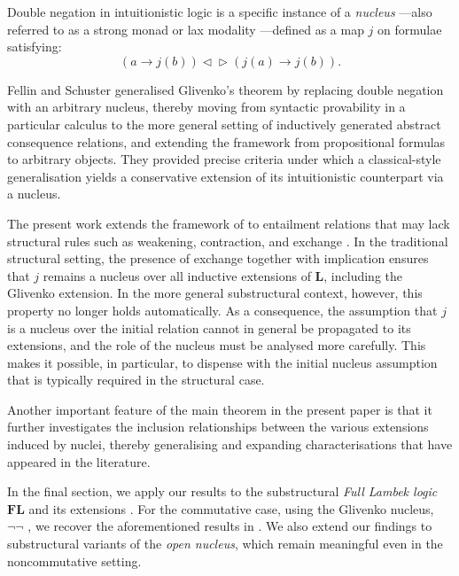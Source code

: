 \documentclass[runningheads]{llncs}
\renewcommand{\L}{\mathbf{L}}
\newcommand{\FL}{\mathbf{FL}}
\begin{document}
Double negation in intuitionistic logic is a specific instance of a \emph{nucleus} \cite{aczel:aspects,hayk:more,joh:sto,negri:cont,rosen,simm:frame,simm:cur,van:kuroda}---also referred to as a strong monad \cite{kock:sdg} or lax modality \cite{aczel_2001}---defined as a map $j$ on formulae satisfying:
\[
(a \to j(b)) \lhd\!\!\rhd (j(a) \to j(b)).
\]

Fellin and Schuster \cite{fel:nuclei,fel:cat} generalised Glivenko's theorem by replacing double negation with an arbitrary nucleus, thereby moving from syntactic provability in a particular calculus to the more general setting of inductively generated abstract consequence relations, and extending the framework from propositional formulas to arbitrary objects. They provided precise criteria under which a classical-style generalisation yields a conservative extension of its intuitionistic counterpart via a nucleus.

The present work extends the framework of \cite{fel:nuclei,fel:cat} to entailment relations that may lack structural rules such as weakening, contraction, and exchange \cite{PAOLI,restall:sub}. In the traditional structural setting, the presence of exchange together with implication ensures that $j$ remains a nucleus over all inductive extensions of $\L$, including the Glivenko extension. In the more general substructural context, however, this property no longer holds automatically. As a consequence, the assumption that $j$ is a nucleus over the initial relation cannot in general be propagated to its extensions, and the role of the nucleus must be analysed more carefully. This makes it possible, in particular, to dispense with the initial nucleus assumption that is typically required in the structural case.

Another important feature of the main theorem in the present paper is that it further investigates the inclusion relationships between the various extensions induced by nuclei, thereby generalising and expanding characterisations that have appeared in the literature.

In the final section, we apply our results to the substructural \emph{Full Lambek logic}~$\FL$ and its extensions \cite{Lambek1958TheMO,Lambek1961OnTC,Lambek1995SomeLM}. For the commutative case, using the Glivenko nucleus, $\neg\neg$ \cite{van:kuroda,esca:peirce}, we recover the aforementioned results in \cite{GO:glitsl,ResLat,ono:gli}. We also extend our findings to substructural variants of the \emph{open nucleus}, which remain meaningful even in the noncommutative setting.
\end{document}
